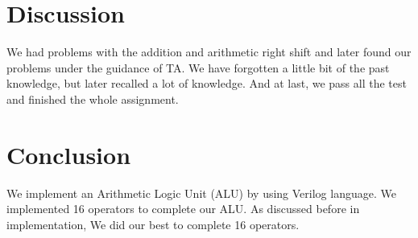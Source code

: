 \documentclass[12pt,a4paper]{article}
\begin{document}
\newpage
\section{Discussion}

We had problems with the addition and arithmetic right shift and later found our problems under the guidance of TA.
We have forgotten a little bit of the past knowledge, but later recalled a lot of knowledge.
And at last, we pass all the test and finished the whole assignment.

\section{Conclusion}

We implement an Arithmetic Logic Unit (ALU) by using Verilog language.
We implemented 16 operators to complete our ALU.
As discussed before in implementation, We did our best to complete 16 operators.
\end{document}
